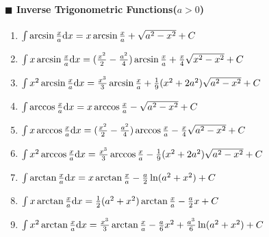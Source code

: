 \paragraph{$\blacksquare$ Inverse Trigonometric Functions($a>0$)}

\begin {enumerate}

\item $ \int \arcsin \frac{x}{a} \mathrm{d} x = x \arcsin \frac{x}{a} + \sqrt{a^2-x^2}+C $

\item $ \int x \arcsin \frac{x}{a} \mathrm{d} x= (\frac{x^2}{2}-\frac{a^2}{4})\arcsin \frac{x}{a} + \frac{x}{4} \sqrt{x^2-x^2}+C$

\item $ \int x^2 \arcsin \frac{x}{a} \mathrm{d} x = \frac{x^3}{3}\arcsin \frac{x}{a}+\frac{1}{9}(x^2+2 a^2)\sqrt{a^2-x^2}+C $

\item $ \int \arccos \frac{x}{a} \mathrm{d} x= x \arccos \frac{x}{a} - \sqrt{a^2-x^2} +C $

\item $ \int x \arccos \frac{x}{a} \mathrm{d} x= (\frac{x^2}{2}-\frac{a^2}{4})\arccos \frac{x}{a} - \frac{x}{4} \sqrt{a^2-x^2}+C $

\item $ \int x^2 \arccos \frac{x}{a}\mathrm{d} x= \frac{x^3}{3}\arccos \frac{x}{a} - \frac{1}{9}(x^2+2a^2)\sqrt{a^2-x^2}+C$

\item $ \int \arctan \frac{x}{a} \mathrm{d} x=x \arctan \frac{x}{a}-\frac{a}{2}\ln (a^2+x^2)+C $

\item $ \int x\arctan \frac{x}{a} \mathrm{d} x = \frac{1}{2}(a^2+x^2)\arctan \frac{x}{a} -\frac{a}{2}x+C $

\item $ \int x^2 \arctan \frac{x}{a} \mathrm{d} x= \frac{x^3}{3} \arctan \frac{x}{a} - \frac{a}{6}x^2 + \frac{a^3}{6} \ln (a^2+x^2)+C $

\end {enumerate}
